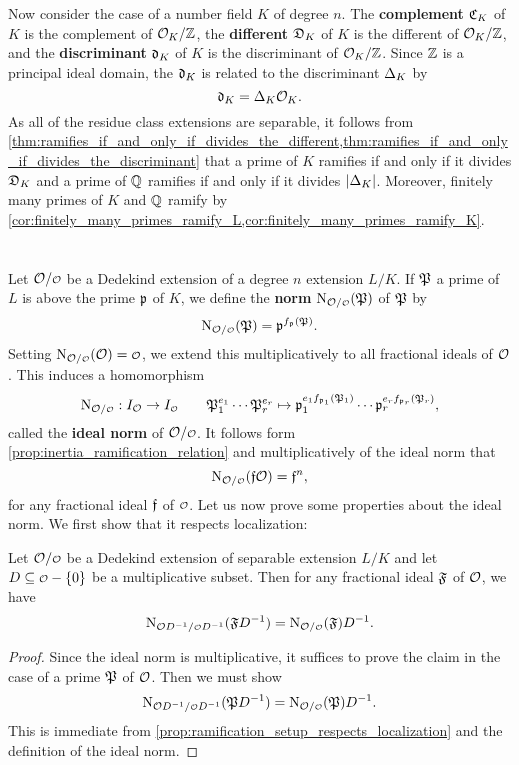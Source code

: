     Now consider the case of a number field $K$ of degree $n$. The \textbf{complement} $\mathfrak{C}_{K}$ of $K$ is the complement of $\mathcal{O}_{K}/\mathbb{Z}$, the \textbf{different} $\mathfrak{D}_{K}$ of $K$ is the different of $\mathcal{O}_{K}/\mathbb{Z}$, and the \textbf{discriminant} $\mathfrak{d}_{K}$ of $K$ is the discriminant of $\mathcal{O}_{K}/\mathbb{Z}$. Since $\mathbb{Z}$ is a principal ideal domain, the $\mathfrak{d}_{K}$ is related to the discriminant $\Delta_{K}$ by
    \[
      \mathfrak{d}_{K} = \Delta_{K}\mathcal{O}_{K}.
    \]
    As all of the residue class extensions are separable, it follows from \cref{thm:ramifies_if_and_only_if_divides_the_different,thm:ramifies_if_and_only_if_divides_the_discriminant} that a prime of $K$ ramifies if and only if it divides $\mathfrak{D}_{K}$ and a prime of $\mathbb{Q}$ ramifies if and only if it divides $|\Delta_{K}|$. Moreover, finitely many primes of $K$ and $\mathbb{Q}$ ramify by \cref{cor:finitely_many_primes_ramify_L,cor:finitely_many_primes_ramify_K}.
  \section{}
    Let $\mc{O}/\smc{O}$ be a Dedekind extension of a degree $n$ extension $L/K$. If $\mathfrak{P}$ a prime of $L$ is above the prime $\mathfrak{p}$ of $K$, we define the \textbf{norm} $\Norm_{\mc{O}/\smc{O}}(\mf{P})$ of $\mathfrak{P}$ by
    \[
      \Norm_{\mc{O}/\smc{O}}(\mf{P}) = \mf{p}^{f_{\mf{p}}(\mf{P})}.
    \]
    Setting $\Norm_{\mc{O}/\smc{O}}(\mc{O}) = \smc{O}$, we extend this multiplicatively to all fractional ideals of $\mathcal{O}$. This induces a homomorphism
    \[
      \Norm_{\mc{O}/\smc{O}}:I_{\mc{O}} \to I_{\smc{O}} \qquad \mf{P}_{1}^{e_{1}} \cdots \mf{P}_{r}^{e_{r}} \mapsto \mf{p}_{1}^{e_{1}f_{\mf{p}_{1}}(\mf{P}_{1})} \cdots \mf{p}_{r}^{e_{r}f_{\mf{p}_{r}}(\mf{P}_{r})},
    \]
    called the \textbf{ideal norm} of $\mc{O}/\smc{O}$. It follows form \cref{prop:inertia_ramification_relation} and multiplicatively of the ideal norm that
    \[
      \Norm_{\mc{O}/\smc{O}}(\mf{f}\mc{O}) = \mf{f}^{n},
    \]
    for any fractional ideal $\mathfrak{f}$ of $\smc{O}$. Let us now prove some properties about the ideal norm. We first show that it respects localization:

    \begin{proposition}\label{prop:ideal_norm_respects_localizations}
      Let $\mc{O}/\smc{O}$ be a Dedekind extension of separable extension $L/K$ and let $D \subseteq \smc{O}-\{0\}$ be a multiplicative subset. Then for any fractional ideal $\mathfrak{F}$ of $\mathcal{O}$, we have
      \[
        \Norm_{\mc{O}D^{-1}/\smc{O}D^{-1}}(\mf{F}D^{-1}) = \Norm_{\mc{O}/\smc{O}}(\mf{F})D^{-1}.
      \]
    \end{proposition}
    \begin{proof}
      Since the ideal norm is multiplicative, it suffices to prove the claim in the case of a prime $\mathfrak{P}$ of $\mathcal{O}$. Then we must show
      \[
        \Norm_{\mc{O}D^{-1}/\smc{O}D^{-1}}(\mf{P}D^{-1}) = \Norm_{\mc{O}/\smc{O}}(\mf{P})D^{-1}.
      \]
      This is immediate from \cref{prop:ramification_setup_respects_localization} and the definition of the ideal norm.
    \end{proof}

